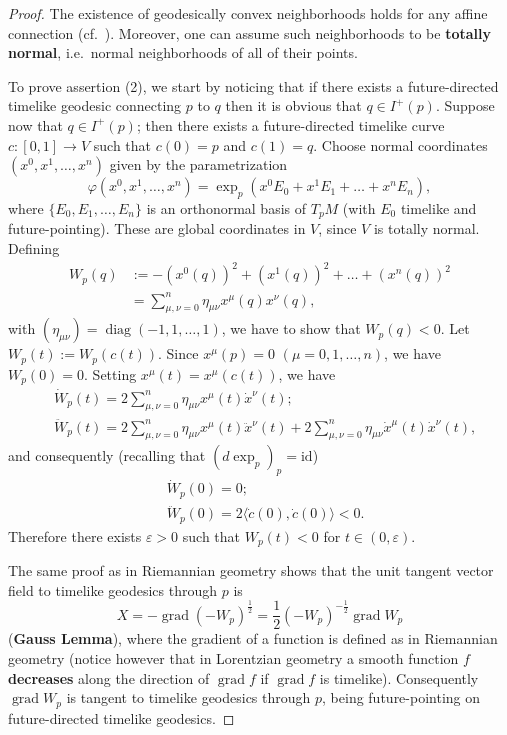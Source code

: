 \documentclass[12pt]{amsart}
\newcommand{\grad}{\operatorname{grad}}
\newcommand{\diag}{\operatorname{diag}}
\theoremstyle{definition}
\theoremstyle{remark}
\begin{document}
\begin{proof}
The existence of geodesically convex neighborhoods holds for any affine connection (cf.~\cite{KN96}). Moreover, one can assume such neighborhoods to be {\bf totally normal}, i.e.~normal neighborhoods of all of their points.

To prove assertion (2), we start by noticing that if there exists a future-directed timelike geodesic connecting $p$ to $q$ then it is obvious that $q \in I^+(p)$. Suppose now that $q \in I^+(p)$; then there exists a future-directed timelike curve $c:[0,1] \to V$ such that $c(0)=p$ and $c(1)=q$. Choose normal coordinates $(x^0, x^1, \ldots, x^n)$ given by the parametrization
\[
\varphi(x^0,x^1,\ldots,x^n)=\exp_p(x^0 E_0 + x^1 E_1 + \ldots + x^n E_n),
\]
where $\{E_0,E_1,\ldots,E_n\}$ is an orthonormal basis of $T_pM$ (with $E_0$ timelike and future-pointing). These are global coordinates in $V$, since $V$ is totally normal. Defining
\begin{align*}
W_p(q) & := - (x^0(q))^2 + (x^1(q))^2 + \ldots + (x^n(q))^2 \\
& = \sum_{\mu,\nu=0}^n \eta_{\mu\nu}x^\mu(q)x^\nu(q),
\end{align*}
with $(\eta_{\mu\nu}) = \diag(-1,1,\ldots,1)$, we have to show that $W_p(q)<0$. Let $W_p(t):= W_p(c(t))$. Since $x^\mu(p)=0$ $(\mu = 0,1,\ldots,n)$, we have $W_p(0)=0$. Setting $x^\mu(t)=x^\mu(c(t))$, we have
\begin{align*}
& \dot{W}_p(t) = 2 \sum_{\mu,\nu=0}^n \eta_{\mu\nu}x^\mu(t)\dot{x}^\nu(t);\\
& \ddot{W}_p(t) = 2 \sum_{\mu,\nu=0}^n \eta_{\mu\nu}x^\mu(t)\ddot{x}^\nu(t) + 2\sum_{\mu,\nu=0}^n \eta_{\mu\nu}\dot{x}^\mu(t)\dot{x}^\nu(t),
\end{align*}
and consequently (recalling that $\left(d \exp_p\right)_p = \text{id}$)
\begin{align*}
& \dot{W}_p(0) = 0;\\
& \ddot{W}_p(0) = 2\langle \dot{c}(0), \dot{c}(0) \rangle < 0.
\end{align*}
Therefore there exists $\varepsilon > 0$ such that $W_p(t) < 0$ for $t \in (0, \varepsilon)$.

The same proof as in Riemannian geometry shows that the unit tangent vector field to timelike geodesics through $p$ is
\[
X = - \grad\left(-W_p\right)^\frac12 = \frac12 \left(-W_p\right)^{-\frac12} \grad W_p
\]
({\bf Gauss Lemma}), where the gradient of a function is defined as in Riemannian geometry (notice however that in Lorentzian geometry a smooth function $f$ {\bf decreases} along the direction of $\grad f$ if $\grad f$ is timelike). Consequently $\grad W_p$ is tangent to timelike geodesics through $p$, being future-pointing on future-directed timelike geodesics.


\end{proof}
\end{document}
